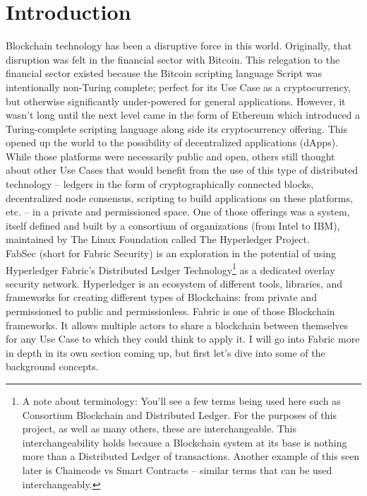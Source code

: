 \section{Introduction}
		\hspace{10mm}Blockchain technology has been a disruptive force in this world. Originally, that disruption was felt in the financial sector with Bitcoin. This relegation to the financial sector existed because the Bitcoin scripting language Script was intentionally non-Turing complete; perfect for its Use Case as a cryptocurrency, but otherwise significantly under-powered for general applications. However, it wasn't long until the next level came in the form of Ethereum which introduced a Turing-complete scripting language along side its cryptocurrency offering. This opened up the world to the possibility of decentralized applications (dApps). While those platforms were necessarily public and open, others still thought about other Use Cases that would benefit from the use of this type of distributed technology -- ledgers in the form of cryptographically connected blocks, decentralized node consensus, scripting to build applications on these platforms, etc. -- in a private and permissioned space. One of those offerings was a system, itself defined and built by a consortium of organizations (from Intel to IBM), maintained by The Linux Foundation called The Hyperledger Project.\\
	
		\hspace{10mm}FabSec (short for Fabric Security) is an exploration in the potential of using Hyperledger Fabric's Distributed Ledger Technology\footnote{A note about terminology: You'll see a few terms being used here such as Consortium Blockchain and Distributed Ledger. For the purposes of this project, as well as many others, these are interchangeable. This interchangeability holds because a Blockchain system at its base is nothing more than a Distributed Ledger of transactions. Another example of this seen later is Chaincode vs Smart Contracts -- similar terms that can be used interchangeably.} as a dedicated overlay security network. Hyperledger is an ecosystem of different tools, libraries, and frameworks for creating different types of Blockchains: from private and permissioned to public and permissionless. Fabric is one of those Blockchain frameworks. It allows multiple actors to share a blockchain between themselves for any Use Case to which they could think to apply it. I will go into Fabric more in depth in its own section coming up, but first let's dive into some of the background concepts.\\
		
